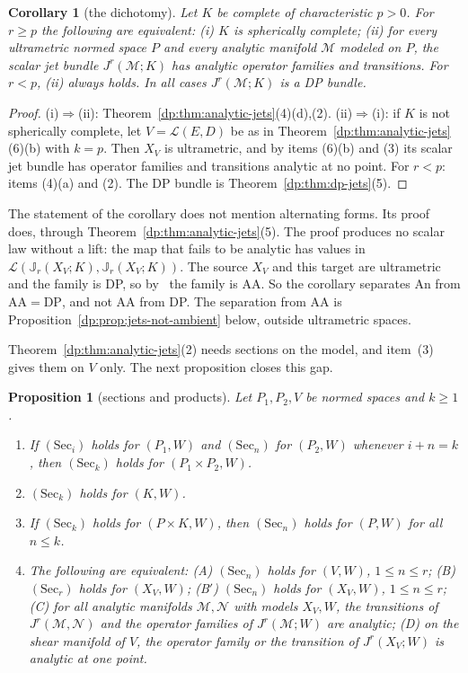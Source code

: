 \documentclass[11pt]{amsart}
\newtheorem{proposition}[theorem]{Proposition}
\newtheorem{corollary}[theorem]{Corollary}
\theoremstyle{definition}
\theoremstyle{remark}
\numberwithin{equation}{section}
\newcommand{\cL}{\mathcal L}
\theoremstyle{plain}
\theoremstyle{definition}
\theoremstyle{plain}
\begin{document}
\begin{corollary}[the dichotomy]\label{dp:cor:jet-dichotomy}
Let $K$ be complete of characteristic $p>0$. For $r\ge p$ the following are equivalent: \textup{(i)} $K$ is spherically complete; \textup{(ii)} for every ultrametric normed space $P$ and every analytic manifold $\mathcal M$ modeled on $P$, the scalar jet bundle $J^r(\mathcal M;K)$ has analytic operator families and transitions. For $r<p$, \textup{(ii)} always holds. In all cases $J^r(\mathcal M;K)$ is a DP bundle.
\end{corollary}

\begin{proof}
(i)$\Rightarrow$(ii): Theorem~\ref{dp:thm:analytic-jets}(4)(d),(2). (ii)$\Rightarrow$(i): if $K$ is not spherically complete, let $V=\cL(E,D)$ be as in Theorem~\ref{dp:thm:analytic-jets}(6)(b) with $k=p$. Then $X_V$ is ultrametric, and by items (6)(b) and (3) its scalar jet bundle has operator families and transitions analytic at no point. For $r<p$: items (4)(a) and (2). The DP bundle is Theorem~\ref{dp:thm:dp-jets}(5).
\end{proof}

The statement of the corollary does not mention alternating forms. Its proof does, through Theorem~\ref{dp:thm:analytic-jets}(5). The proof produces no scalar law without a lift: the map that fails to be analytic has values in $\cL(\mathbb J_r(X_V;K),\mathbb J_r(X_V;K))$. The source $X_V$ and this target are ultrametric and the family is DP, so by~\cite[Theorem~14.39(1)]{I} the family is AA. So the corollary separates An from $\mathrm{AA}=\mathrm{DP}$, and not AA from DP. The separation from AA is Proposition~\ref{dp:prop:jets-not-ambient} below, outside ultrametric spaces.

Theorem~\ref{dp:thm:analytic-jets}(2) needs sections on the model, and item~(3) gives them on $V$ only. The next proposition closes this gap.

\begin{proposition}[sections and products]\label{dp:prop:sec-products}
Let $P_1,P_2,V$ be normed spaces and $k\ge1$.
\begin{enumerate}
\item If $(\mathrm{Sec}_i)$ holds for $(P_1,W)$ and $(\mathrm{Sec}_n)$ for $(P_2,W)$ whenever $i+n=k$, then $(\mathrm{Sec}_k)$ holds for $(P_1\times P_2,W)$.
\item $(\mathrm{Sec}_k)$ holds for $(K,W)$.
\item If $(\mathrm{Sec}_k)$ holds for $(P\times K,W)$, then $(\mathrm{Sec}_n)$ holds for $(P,W)$ for all $n\le k$.
\item The following are equivalent: \textup{(A)} $(\mathrm{Sec}_n)$ holds for $(V,W)$, $1\le n\le r$; \textup{(B)} $(\mathrm{Sec}_r)$ holds for $(X_V,W)$; \textup{(B$'$)} $(\mathrm{Sec}_n)$ holds for $(X_V,W)$, $1\le n\le r$; \textup{(C)} for all analytic manifolds $\mathcal M,\mathcal N$ with models $X_V,W$, the transitions of $J^r(\mathcal M,\mathcal N)$ and the operator families of $J^r(\mathcal M;W)$ are analytic; \textup{(D)} on the shear manifold of $V$, the operator family or the transition of $J^r(X_V;W)$ is analytic at one point.
\end{enumerate}
\end{proposition}
\end{document}
